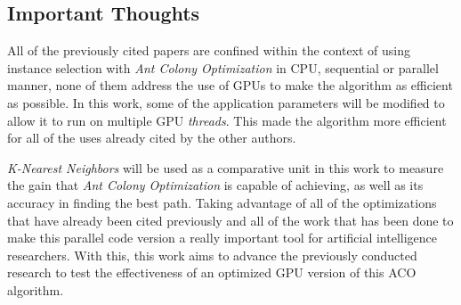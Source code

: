 \subsection{Important Thoughts}

All of the previously cited papers are confined within the context of using instance selection with \emph{Ant Colony Optimization} in CPU, sequential or parallel manner, none of them address the use of GPUs to
make the algorithm as efficient as possible. In this work, some of the application parameters will be modified to allow it to run on multiple GPU \emph{threads}. This made the algorithm more efficient for all of the uses already cited by the other authors.

\emph{K-Nearest Neighbors} will be used as a comparative unit in this work to measure the gain that \emph{Ant Colony Optimization} is capable of achieving, as well as its accuracy in finding the best path. Taking advantage of all of the optimizations that have already been cited previously and all of the work that has been done to make this parallel code version a really important tool for artificial intelligence researchers. With this, this work aims to advance the previously conducted research to test the effectiveness of an optimized GPU version of this ACO algorithm.
